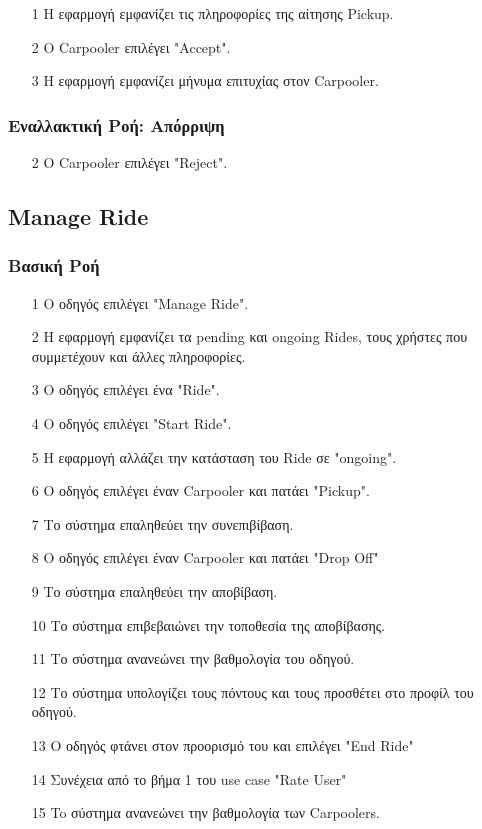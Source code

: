 \begin{enumerate}
    \item[1] Η εφαρμογή εμφανίζει τις πληροφορίες της αίτησης Pickup.
    \item[2] Ο Carpooler επιλέγει "Accept".
    \item[3] Η εφαρμογή εμφανίζει μήνυμα επιτυχίας στον Carpooler.
\end{enumerate}

\subsubsection{Εναλλακτική Ροή: Απόρριψη}

\begin{enumerate}
    \item[2] Ο Carpooler επιλέγει "Reject".
\end{enumerate}

\subsection{Manage Ride}

\subsubsection{Βασική Ροή}

\begin{enumerate}
    \item[1] Ο οδηγός επιλέγει "Manage Ride".
    \item[2] Η εφαρμογή εμφανίζει τα pending και ongoing Rides, τους χρήστες που συμμετέχουν και άλλες
        πληροφορίες.
    \item[3] Ο οδηγός επιλέγει ένα "Ride".
    \item[4] Ο οδηγός επιλέγει "Start Ride".
    \item[5] Η εφαρμογή αλλάζει την κατάσταση του Ride σε "ongoing".
    \item[6] Ο οδηγός επιλέγει έναν Carpooler και πατάει "Pickup".
    \item[7] Το σύστημα επαληθεύει την συνεπιβίβαση.
    \item[8] Ο οδηγός επιλέγει έναν Carpooler και πατάει "Drop Off"
    \item[9] Το σύστημα επαληθεύει την αποβίβαση.
    \item[10] Το σύστημα επιβεβαιώνει την τοποθεσία της αποβίβασης.
    \item[11] Το σύστημα ανανεώνει την βαθμολογία του οδηγού.
    \item[12] Το σύστημα υπολογίζει τους πόντους και τους προσθέτει στο προφίλ του οδηγού.
    \item[13] Ο οδηγός φτάνει στον προορισμό του και επιλέγει "End Ride"
    \item[14] Συνέχεια από το βήμα 1 του use case "Rate User"
    \item[15] To σύστημα ανανεώνει την βαθμολογία των Carpoolers.
\end{enumerate}

